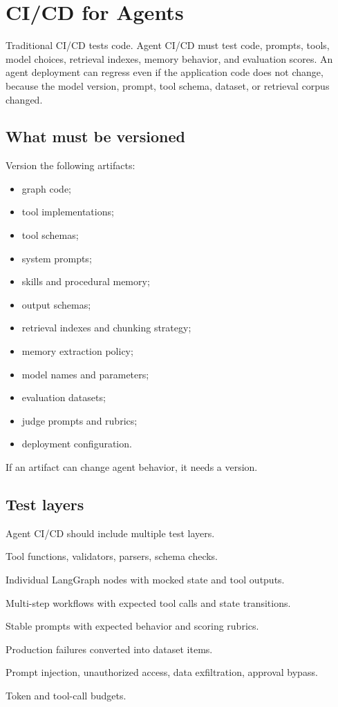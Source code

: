 \chapter{CI/CD for Agents}

Traditional CI/CD tests code. Agent CI/CD must test code, prompts, tools, model choices, retrieval indexes, memory behavior, and evaluation scores. An agent deployment can regress even if the application code does not change, because the model version, prompt, tool schema, dataset, or retrieval corpus changed.

\section{What must be versioned}

Version the following artifacts:

\begin{itemize}[leftmargin=*]
  \item graph code;
  \item tool implementations;
  \item tool schemas;
  \item system prompts;
  \item skills and procedural memory;
  \item output schemas;
  \item retrieval indexes and chunking strategy;
  \item memory extraction policy;
  \item model names and parameters;
  \item evaluation datasets;
  \item judge prompts and rubrics;
  \item deployment configuration.
\end{itemize}

If an artifact can change agent behavior, it needs a version.

\section{Test layers}

Agent CI/CD should include multiple test layers.

\begin{description}[leftmargin=*]
  \item[Unit tests.] Tool functions, validators, parsers, schema checks.
  \item[Node tests.] Individual LangGraph nodes with mocked state and tool outputs.
  \item[Trajectory tests.] Multi-step workflows with expected tool calls and state transitions.
  \item[Golden datasets.] Stable prompts with expected behavior and scoring rubrics.
  \item[Regression tests.] Production failures converted into dataset items.
  \item[Security tests.] Prompt injection, unauthorized access, data exfiltration, approval bypass.
  \item[Cost tests.] Token and tool-call budgets.
\end{description}

